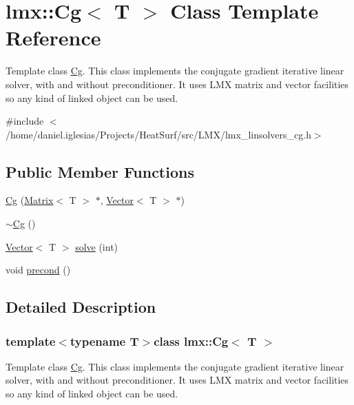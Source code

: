 \hypertarget{classlmx_1_1Cg}{\section{lmx\-:\-:Cg$<$ T $>$ Class Template Reference}
\label{classlmx_1_1Cg}
}


Template class \hyperlink{classlmx_1_1Cg}{Cg}. This class implements the conjugate gradient iterative linear solver, with and without preconditioner. It uses L\-M\-X matrix and vector facilities so any kind of linked object can be used.  




{\ttfamily \#include $<$/home/daniel.\-iglesias/\-Projects/\-Heat\-Surf/src/\-L\-M\-X/lmx\-\_\-linsolvers\-\_\-cg.\-h$>$}

\subsection*{Public Member Functions}
\begin{DoxyCompactItemize}
\item 
\hyperlink{classlmx_1_1Cg_ae188703493098d949b9f0f107a845a87}{Cg} (\hyperlink{classlmx_1_1Matrix}{Matrix}$<$ T $>$ $\ast$, \hyperlink{classlmx_1_1Vector}{Vector}$<$ T $>$ $\ast$)
\item 
\hyperlink{classlmx_1_1Cg_aca7ad968e0ed9d6bf08bdc4f4ba6ddbc}{$\sim$\-Cg} ()
\item 
\hyperlink{classlmx_1_1Vector}{Vector}$<$ T $>$ \hyperlink{classlmx_1_1Cg_a78b28ffbb590c2126b0fecc972368661}{solve} (int)
\item 
void \hyperlink{classlmx_1_1Cg_add75b6264e99d649c3b4723e274aa899}{precond} ()
\end{DoxyCompactItemize}


\subsection{Detailed Description}
\subsubsection*{template$<$typename T$>$class lmx\-::\-Cg$<$ T $>$}

Template class \hyperlink{classlmx_1_1Cg}{Cg}. This class implements the conjugate gradient iterative linear solver, with and without preconditioner. It uses L\-M\-X matrix and vector facilities so any kind of linked object can be used. 


